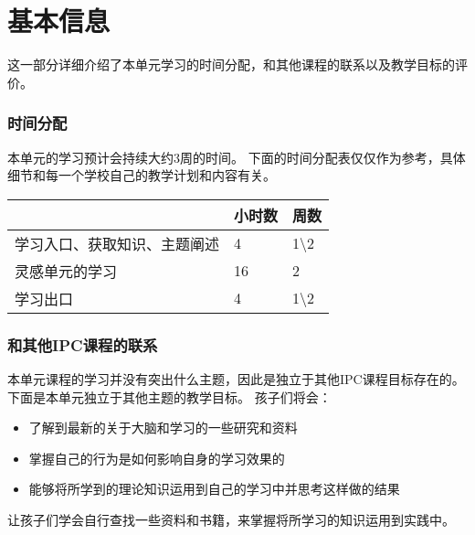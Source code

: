 \chapter{基本信息}
    这一部分详细介绍了本单元学习的时间分配，和其他课程的联系以及教学目标的评价。

\subsection{时间分配}
    本单元的学习预计会持续大约3周的时间。
    下面的时间分配表仅仅作为参考，具体细节和每一个学校自己的教学计划和内容有关。

\begin{table}[h]     
\begin{tabular}{l|l|l}
\hline
                         & 小时数 & 周数  \\
\hline
学习入口、获取知识、主题阐述 &  4 & 1\textbackslash2 \\
灵感单元的学习  & 16  &   2  \\
学习出口  & 4  &  1\textbackslash2 \\
\hline
\end{tabular}
\end{table}



\subsection{和其他IPC课程的联系}
    本单元课程的学习并没有突出什么主题，因此是独立于其他IPC课程目标存在的。下面是本单元独立于其他主题的教学目标。
    孩子们将会：
    \begin{itemize}
      \item 了解到最新的关于大脑和学习的一些研究和资料 
      \item 掌握自己的行为是如何影响自身的学习效果的
      \item 能够将所学到的理论知识运用到自己的学习中并思考这样做的结果
    \end{itemize}

\begin{exercise}
  让孩子们学会自行查找一些资料和书籍，来掌握将所学习的知识运用到实践中。
  
\end{exercise}
